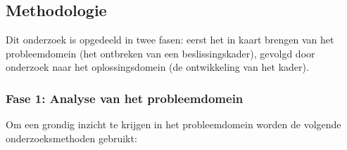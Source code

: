 
\chapter{}%
\label{ch:methodologie}


\section{Methodologie}%
Dit onderzoek is opgedeeld in twee fasen: eerst het in kaart brengen van het probleemdomein (het ontbreken van een beslissingskader), gevolgd door onderzoek naar het oplossingsdomein (de ontwikkeling van het kader).
\subsection{Fase 1: Analyse van het probleemdomein}
Om een grondig inzicht te krijgen in het probleemdomein worden de volgende onderzoeksmethoden gebruikt:
